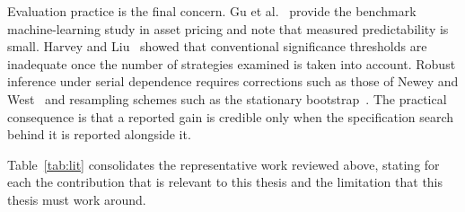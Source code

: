 Evaluation practice is the final concern. Gu et al.~\cite{gu2020} provide the benchmark
machine-learning study in asset pricing and note that measured predictability is small.
Harvey and Liu~\cite{harvey2015} showed that conventional significance thresholds are
inadequate once the number of strategies examined is taken into account. Robust inference
under serial dependence requires corrections such as those of Newey and
West~\cite{newey1987} and resampling schemes such as the stationary
bootstrap~\cite{politis1994}. The practical consequence is that a reported gain is
credible only when the specification search behind it is reported alongside it.

Table~\ref{tab:lit} consolidates the representative work reviewed above, stating for each
the contribution that is relevant to this thesis and the limitation that this thesis must
work around.

